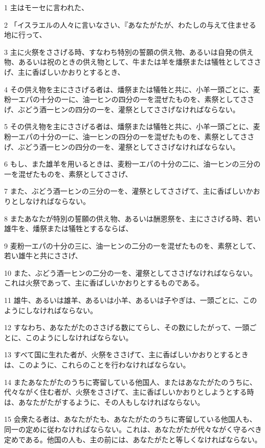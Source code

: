 \par 1 主はモーセに言われた、
\par 2 「イスラエルの人々に言いなさい、『あなたがたが、わたしの与えて住ませる地に行って、
\par 3 主に火祭をささげる時、すなわち特別の誓願の供え物、あるいは自発の供え物、あるいは祝のときの供え物として、牛または羊を燔祭または犠牲としてささげ、主に香ばしいかおりとするとき、
\par 4 その供え物を主にささげる者は、燔祭または犠牲と共に、小羊一頭ごとに、麦粉一エパの十分の一に、油一ヒンの四分の一を混ぜたものを、素祭としてささげ、ぶどう酒一ヒンの四分の一を、灌祭としてささげなければならない。
\par 5 その供え物を主にささげる者は、燔祭または犠牲と共に、小羊一頭ごとに、麦粉一エパの十分の一に、油一ヒンの四分の一を混ぜたものを、素祭としてささげ、ぶどう酒一ヒンの四分の一を、灌祭としてささげなければならない。
\par 6 もし、また雄羊を用いるときは、麦粉一エパの十分の二に、油一ヒンの三分の一を混ぜたものを、素祭としてささげ、
\par 7 また、ぶどう酒一ヒンの三分の一を、灌祭としてささげて、主に香ばしいかおりとしなければならない。
\par 8 またあなたが特別の誓願の供え物、あるいは酬恩祭を、主にささげる時、若い雄牛を、燔祭または犠牲とするならば、
\par 9 麦粉一エパの十分の三に、油一ヒンの二分の一を混ぜたものを、素祭として、若い雄牛と共にささげ、
\par 10 また、ぶどう酒一ヒンの二分の一を、灌祭としてささげなければならない。これは火祭であって、主に香ばしいかおりとするものである。
\par 11 雄牛、あるいは雄羊、あるいは小羊、あるいは子やぎは、一頭ごとに、このようにしなければならない。
\par 12 すなわち、あなたがたのささげる数にてらし、その数にしたがって、一頭ごとに、このようにしなければならない。
\par 13 すべて国に生れた者が、火祭をささげて、主に香ばしいかおりとするときは、このように、これらのことを行わなければならない。
\par 14 またあなたがたのうちに寄留している他国人、またはあなたがたのうちに、代々ながく住む者が、火祭をささげて、主に香ばしいかおりとしようとする時は、あなたがたがするように、その人もしなければならない。
\par 15 会衆たる者は、あなたがたも、あなたがたのうちに寄留している他国人も、同一の定めに従わなければならない。これは、あなたがたが代々ながく守るべき定めである。他国の人も、主の前には、あなたがたと等しくなければならない。
